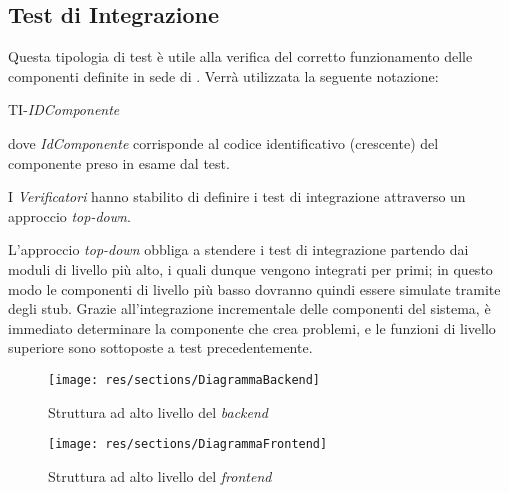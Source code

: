 \newpage
\subsection{Test di Integrazione}
Questa tipologia di test è utile alla verifica del corretto funzionamento delle componenti definite in sede di \SpecificaTecnica.
Verrà utilizzata la seguente notazione:
	\begin{center}
		TI-\textit{IDComponente}
	\end{center}
dove \textit{IdComponente} corrisponde al codice identificativo (crescente) del componente preso in esame
dal test.

I \textit{Verificatori} hanno stabilito di definire i test di integrazione attraverso un approccio  \textit{top-down}. 


L'approccio \textit{top-down} obbliga a stendere i test di integrazione partendo dai moduli
di livello più alto, i quali dunque vengono integrati per primi;
in questo modo le componenti di livello più basso dovranno quindi essere simulate tramite degli
stub. Grazie all'integrazione incrementale delle componenti del sistema, è immediato determinare
la componente che crea problemi, e le funzioni di livello superiore sono sottoposte a test precedentemente.

\begin{figure}[H]
      \begin{center}
        \texttt{[image: res/sections/DiagrammaBackend]}
      \caption{Struttura ad alto livello del \textit{backend}}
      \end{center}
\end{figure}

\begin{figure}[H]

        \centering
        \texttt{[image: res/sections/DiagrammaFrontend]}
        \caption{Struttura ad alto livello del \textit{frontend}}
\end{figure}





